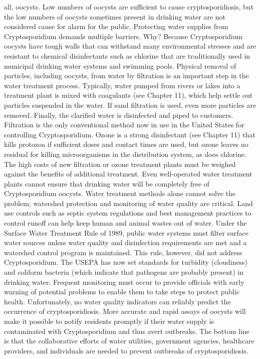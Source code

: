 \documentclass{article}
\begin{document}
all, oocysts. Low numbers of oocysts are sufficient to cause
cryptosporidiosis, but the low numbers of oocysts sometimes present in
drinking water are not considered cause for alarm for the public.
Protecting water supplies from Cryptosporidium demands multiple
barriers. Why? Because Cryptosporidium oocysts have tough walls that can
withstand many environmental stresses and are resistant to chemical
disinfectants such as chlorine that are traditionally used in municipal
drinking water systems and swimming pools. Physical removal of
particles, including oocysts, from water by filtration is an important
step in the water treatment process. Typically, water pumped from rivers
or lakes into a treatment plant is mixed with coagulants (see Chapter
11), which help settle out particles suspended in the water. If sand
filtration is used, even more particles are removed. Finally, the
clarified water is disinfected and piped to customers. Filtration is the
only conventional method now in use in the United States for controlling
Cryptosporidium. Ozone is a strong disinfectant (see Chapter 11) that
kills protozoa if sufficient doses and contact times are used, but ozone
leaves no residual for killing microorganisms in the distribution
system, as does chlorine. The high costs of new filtration or ozone
treatment plants must be weighed against the benefits of additional
treatment. Even well-operated water treatment plants cannot ensure that
drinking water will be completely free of Cryptosporidium oocysts. Water
treatment methods alone cannot solve the problem; watershed protection
and monitoring of water quality are critical. Land use controls such as
septic system regulations and best management practices to control
runoff can help keep human and animal wastes out of water. Under the
Surface Water Treatment Rule of 1989, public water systems must filter
surface water sources unless water quality and disinfection requirements
are met and a watershed control program is maintained. This rule,
however, did not address Cryptosporidium. The USEPA has now set
standards for turbidity (cloudiness) and coliform bacteria (which
indicate that pathogens are probably present) in drinking water.
Frequent monitoring must occur to provide officials with early warning
of potential problems to enable them to take steps to protect public
health. Unfortunately, no water quality indicators can reliably predict
the occurrence of cryptosporidiosis. More accurate and rapid assays of
oocysts will make it possible to notify residents promptly if their
water supply is contaminated with Cryptosporidium and thus avert
outbreaks. The bottom line is that the collaborative efforts of water
utilities, government agencies, healthcare providers, and individuals
are needed to prevent outbreaks of cryptosporidiosis.
\end{document}
